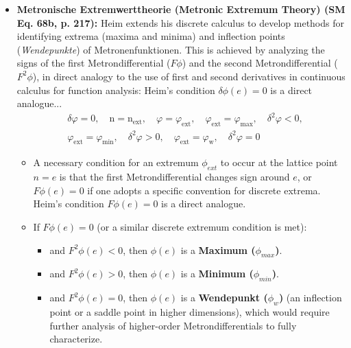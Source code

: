 \documentclass[12pt]{article}
\newcommand{\metrondifferential}{F} %
\newcommand{\metronenziffer}{n}
\begin{document}
\begin{itemize}
    \item \textbf{Metronische Extremwerttheorie (Metronic Extremum Theory) (SM Eq. 68b, p. 217):}
    Heim extends his discrete calculus to develop methods for identifying extrema (maxima and minima) and inflection points (\textit{Wendepunkte}) of Metronenfunktionen. This is achieved by analyzing the signs of the first Metrondifferential (\( \metrondifferential\phi \)) and the second Metrondifferential (\( \metrondifferential^2\phi \)), in direct analogy to the use of first and second derivatives in continuous calculus for function analysis:
    Heim's condition $\delta\phi(e) = 0$ is a direct analogue...
    \begin{equation}
    \begin{aligned}
    & \delta\varphi = 0, \quad \mathrm{n} = \mathrm{n}_{\mathrm{ext}}, \quad \varphi = \varphi_{\mathrm{ext}}, \quad \varphi_{\mathrm{ext}} = \varphi_{\mathrm{max}}, \quad \delta^2\varphi < 0, \\
    & \varphi_{\mathrm{ext}} = \varphi_{\mathrm{min}}, \quad \delta^2\varphi > 0, \quad \varphi_{\mathrm{ext}} = \varphi_{\mathrm{w}}, \quad \delta^2\varphi = 0
    \end{aligned} \tag{68b}
    \end{equation}
    \begin{itemize}
        \item A necessary condition for an extremum \( \phi_{ext} \) to occur at the lattice point \( \metronenziffer=e \) is that the first Metrondifferential changes sign around \(e\), or \( \metrondifferential\phi(e) = 0 \) if one adopts a specific convention for discrete extrema. Heim's condition \( \metrondifferential\phi(e) = 0 \) is a direct analogue.
        \item If \( \metrondifferential\phi(e) = 0 \) (or a similar discrete extremum condition is met):
        \begin{itemize}
            \item and \( \metrondifferential^2\phi(e) < 0 \), then \( \phi(e) \) is a \textbf{Maximum (\( \phi_{max} \))}.
            \item and \( \metrondifferential^2\phi(e) > 0 \), then \( \phi(e) \) is a \textbf{Minimum (\( \phi_{min} \))}.
            \item and \( \metrondifferential^2\phi(e) = 0 \), then \( \phi(e) \) is a \textbf{Wendepunkt (\( \phi_w \))} (an inflection point or a saddle point in higher dimensions), which would require further analysis of higher-order Metrondifferentials to fully characterize.
        \end{itemize}
    \end{itemize}
\end{itemize}
\end{document}
